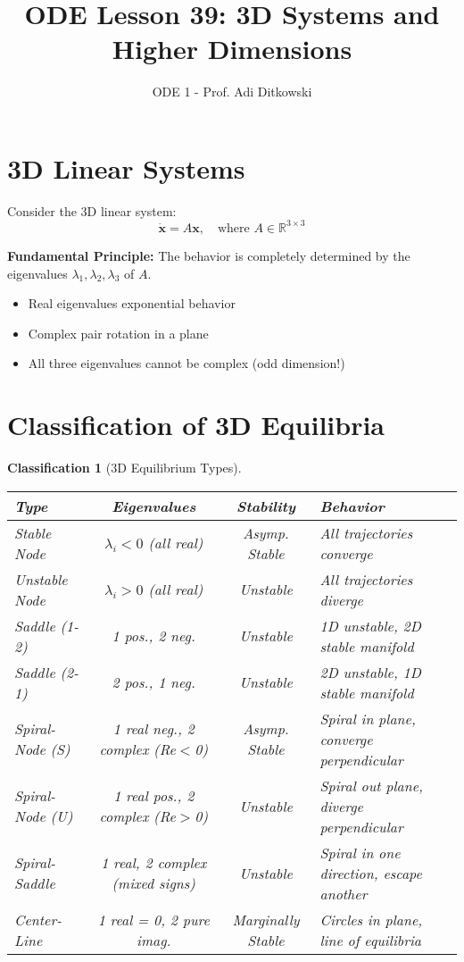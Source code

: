 \documentclass[12pt]{article}
\title{ODE Lesson 39: 3D Systems and Higher Dimensions}
\author{ODE 1 - Prof. Adi Ditkowski}
\date{}
\newtheorem{classification}{Classification}
\begin{document}
\maketitle

\section{3D Linear Systems}

Consider the 3D linear system:
$$\dot{\mathbf{x}} = A\mathbf{x}, \quad \text{where } A \in \mathbb{R}^{3 \times 3}$$

\begin{keypoint}
\textbf{Fundamental Principle:}
The behavior is completely determined by the eigenvalues $\lambda_{1}, \lambda_{2}, \lambda_{3}$ of $A$.
\begin{itemize}
    \item Real eigenvalues \rightarrow exponential behavior
    \item Complex pair \rightarrow rotation in a plane
    \item All three eigenvalues cannot be complex (odd dimension!)
\end{itemize}
\end{keypoint}

\section{Classification of 3D Equilibria}

\begin{classification}[3D Equilibrium Types]
\begin{center}
\begin{tabular}{|l|c|c|p{5cm}|}
\hline
\textbf{Type} & \textbf{Eigenvalues} & \textbf{Stability} & \textbf{Behavior} \\
\hline
\hline
Stable Node & $\lambda_{i} < 0$ (all real) & Asymp. Stable & All trajectories converge \\
\hline
Unstable Node & $\lambda_{i} > 0$ (all real) & Unstable & All trajectories diverge \\
\hline
Saddle (1-2) & 1 pos., 2 neg. & Unstable & 1D unstable, 2D stable manifold \\
\hline
Saddle (2-1) & 2 pos., 1 neg. & Unstable & 2D unstable, 1D stable manifold \\
\hline
Spiral-Node (S) & 1 real neg., 2 complex (Re$<$0) & Asymp. Stable & Spiral in plane, converge perpendicular \\
\hline
Spiral-Node (U) & 1 real pos., 2 complex (Re$>$0) & Unstable & Spiral out plane, diverge perpendicular \\
\hline
Spiral-Saddle & 1 real, 2 complex (mixed signs) & Unstable & Spiral in one direction, escape another \\
\hline
Center-Line & 1 real = 0, 2 pure imag. & Marginally Stable & Circles in plane, line of equilibria \\
\hline
\end{tabular}
\end{center}
\end{classification}
\end{document}
